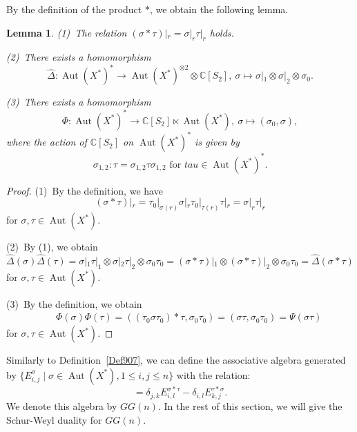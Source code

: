 \documentclass{article}
\newtheorem{Lemma}[equation]{Lemma}
\theoremstyle{definition}
\theoremstyle{remark}
\numberwithin{equation}{section}
\DeclareMathOperator{\Aut}{Aut}
\numberwithin{equation}{section}
\begin{document}
By the definition of the product $\ast$, we obtain the following lemma.
\begin{Lemma}\label{Lem980}
\textup{(1)}\ The relation $(\sigma\ast\tau)|_r=\sigma|_r\tau|_r$ holds.

\textup{(2)}\ There exists a homomorphism
\[
\widehat{\Delta}\colon \Aut(X^*)^\ast\to\Aut(X^*)^{\otimes2}\otimes\mathbb{C}[S_2],\ \sigma\mapsto\sigma|_1\otimes\sigma|_2\otimes\sigma_0.
\]

\textup{(3)}\ There exists a homomorphism
\[
\Phi\colon\Aut(X^*)^\ast\to\mathbb{C}[S_2]\ltimes\Aut(X^*),\ \sigma\mapsto(\sigma_0,\sigma),
\]
where the action of $\mathbb{C}[S_2]$ on $\Aut(X^*)^\ast$ is given by
\[
\sigma_{1,2}\colon \tau=\sigma_{1,2}\tau\sigma_{1,2}\text{ for }tau\in\Aut(X^*)^\ast.
\]
\end{Lemma}
\begin{proof}
\textup{(1)}\ By the definition, we have 
\[
(\sigma\ast\tau)|_r=\tau_0|_{\sigma(r)}\sigma|_r\tau_0|_{\tau(r)}\tau|_r=\sigma|_r\tau|_r
\]
for $\sigma,\tau\in\Aut(X^*)$.

\textup{(2)}\ By (1), we obtain
\[
\widehat{\Delta}(\sigma)\widehat{\Delta}(\tau)=\sigma|_1\tau|_1\otimes\sigma|_2\tau|_2\otimes\sigma_0\tau_0=(\sigma\ast\tau)|_1\otimes(\sigma\ast\tau)|_2\otimes\sigma_0\tau_0=\widehat{\Delta}(\sigma\ast\tau)
\]
for $\sigma,\tau\in\Aut(X^*)$.

\textup{(3)}\ By the definition, we obtain
\begin{align*}
&\quad \Phi(\sigma)\Phi(\tau)=((\tau_0\sigma\tau_0)\ast\tau,\sigma_0\tau_0)=(\sigma\tau,\sigma_0\tau_0)=\Psi(\sigma\tau)
\end{align*}
for $\sigma,\tau\in\Aut(X^*)$.
\end{proof}
Similarly to Definition~\ref{Def907}, we can define the associative algebra generated by $\{E^\sigma_{i,j}\mid\sigma\in\Aut(X^*),1\leq i,j\leq n\}$ with the relation:
\begin{equation}
[E_{i,j}^\sigma,E_{k,l}^\tau]=\delta_{j,k}E_{i,l}^{\sigma\ast\tau}-\delta_{i,l}E_{k,j}^{\tau\ast\sigma}.\label{def2}    
\end{equation}
We denote this algebra by $GG(n)$. 
In the rest of this section, we will give the Schur-Weyl duality for $GG(n)$.
\end{document}
